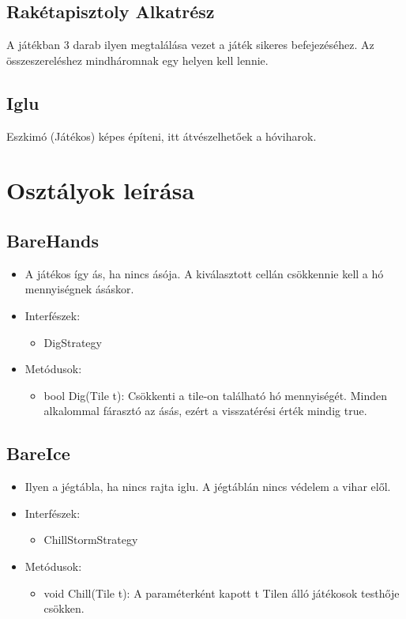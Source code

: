 \subsection{Rakétapisztoly Alkatrész}
A játékban 3 darab ilyen megtalálása vezet a játék sikeres befejezéséhez. Az összeszereléshez mindháromnak egy helyen kell lennie.

\subsection{Iglu}
Eszkimó (Játékos) képes építeni, itt átvészelhetőek a hóviharok.

\section{Osztályok leírása}
\subsection{BareHands}
\begin{itemize}
	\item A játékos így ás, ha nincs ásója. A kiválasztott cellán csökkennie kell a hó mennyiségnek ásáskor.
	\item Interfészek:
	\begin{itemize}
		\item DigStrategy
	\end{itemize}
	\item Metódusok:
	\begin{itemize}
		\item bool Dig(Tile t): Csökkenti a tile-on található hó mennyiségét. Minden alkalommal fárasztó az ásás, ezért a visszatérési érték mindig true.
	\end{itemize}
\end{itemize}

\subsection{BareIce}
\begin{itemize}
	\item Ilyen a jégtábla, ha nincs rajta iglu. A jégtáblán nincs védelem a vihar elől.
	\item Interfészek:
	\begin{itemize}
		\item ChillStormStrategy
	\end{itemize}
	\item Metódusok:
	\begin{itemize}
		\item void Chill(Tile t): A paraméterként kapott t Tilen álló játékosok testhője csökken.
	\end{itemize}
\end{itemize}


